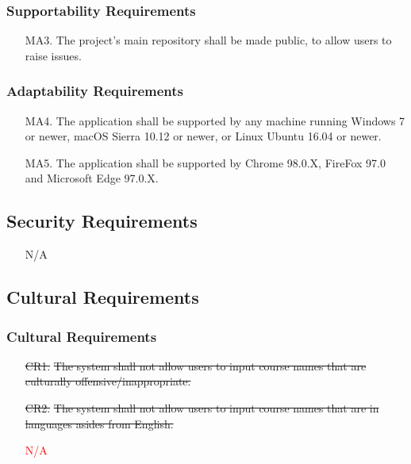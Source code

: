 \documentclass[12pt, titlepage]{article}
\begin{document}
\subsubsection{Supportability Requirements}

\begin{itemize}
  \item[MA3.] The project’s main repository shall be made public, to allow users to raise issues. 
\end{itemize}

\subsubsection{Adaptability Requirements}

\begin{itemize}
  \item[MA4.] The application shall be supported by any machine running Windows 7 or newer, macOS Sierra 10.12 or newer, or Linux Ubuntu 16.04 or newer.
  \item[MA5.] The application shall be supported by Chrome 98.0.X, FireFox 97.0 and Microsoft Edge 97.0.X. 
\end{itemize}

\subsection{Security Requirements}

\begin{itemize}
  \item[] N/A
\end{itemize}

\subsection{Cultural Requirements}

\subsubsection{Cultural Requirements}

\begin{itemize}
  \item[\sout{CR1.}] \sout{The system shall not allow users to input course names that are culturally offensive/inappropriate. }
  \item[\sout{CR2.}] \sout{The system shall not allow users to input course names that are in languages asides from English. }
  \item [] \textcolor{red}{N/A}
\end{itemize}
\end{document}
